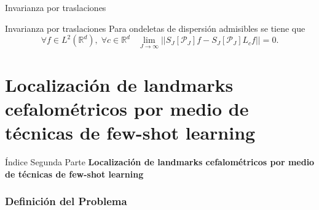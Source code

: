 \documentclass[aspectratio=43]{beamer}
\renewcommand{\cite}[1]{\footnote<.->[frame]{\fullcite{#1}}}
\begin{document}
\begin{frame}{Invarianza por traslaciones}
  \begin{alertblock}{Invarianza por traslaciones}
    Para ondeletas de dispersión admisibles se tiene que
    $$\forall f \in L^2(\mathbb{R}^d), \; \forall c\in \mathbb{R}^d \;\;\; \lim_{J\rightarrow \infty}||S_J[\mathcal{P}_J] f-S_J[\mathcal{P}_J] L_cf||=0.$$
  \end{alertblock}
\end{frame}

\part{Localización de landmarks cefalométricos por medio de técnicas de few-shot learning}

\begin{frame}{Índice Segunda Parte}
  \textcolor{tudCyan}{\textbf{Localización de landmarks cefalométricos por medio de técnicas de few-shot learning}}
  \medskip
  \tableofcontents[part=2]
\end{frame}


\section{Definición del Problema}


\end{document}
